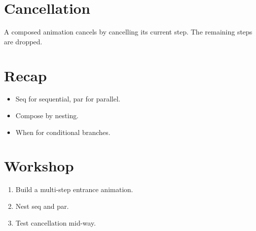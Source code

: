 \section{Cancellation}

A composed animation cancels by cancelling its current
step. The remaining steps are dropped.

\section{Recap}

\begin{recap}
\begin{itemize}[leftmargin=*]
  \item Seq for sequential, par for parallel.
  \item Compose by nesting.
  \item When for conditional branches.
\end{itemize}
\end{recap}

\section*{Workshop}

\begin{enumerate}[leftmargin=*]
  \item Build a multi-step entrance animation.
  \item Nest seq and par.
  \item Test cancellation mid-way.
\end{enumerate}
